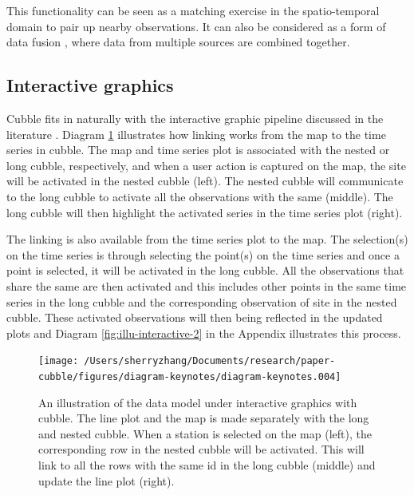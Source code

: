 \documentclass[
]{jss}
\begin{document}
This functionality can be seen as a matching exercise
\citep{stuart2010matching, mcintosh2018using} in the spatio-temporal
domain to pair up nearby observations. It can also be considered as a
form of data fusion \citep{castanedo2013review, cocchi2019data}, where
data from multiple sources are combined together.

\hypertarget{interactive-graphics}{%
\subsection{Interactive graphics}\label{interactive-graphics}}

Cubble fits in naturally with the interactive graphic pipeline discussed
in the literature
\citep{buja1988elements, buja1996interactive, sutherland2000orca, xie2014reactive, cheng2016enabling}.
Diagram \ref{fig:illu-interactive} illustrates how linking works from
the map to the time series in cubble. The map and time series plot is
associated with the nested or long cubble, respectively, and when a user
action is captured on the map, the site will be activated in the nested
cubble (left). The nested cubble will communicate to the long cubble to
activate all the observations with the same  (middle). The long
cubble will then highlight the activated series in the time series plot
(right).

The linking is also available from the time series plot to the map. The
selection(s) on the time series is through selecting the point(s) on the
time series and once a point is selected, it will be activated in the
long cubble. All the observations that share the same  are then
activated and this includes other points in the same time series in the
long cubble and the corresponding observation of site in the nested
cubble. These activated observations will then being reflected in the
updated plots and Diagram \ref{fig:illu-interactive-2} in the Appendix
illustrates this process.

\begin{CodeChunk}
\begin{figure}

{\centering \texttt{[image: /Users/sherryzhang/Documents/research/paper-cubble/figures/diagram-keynotes/diagram-keynotes.004]} 

}

\caption[An illustration of the data model under interactive graphics with cubble]{An illustration of the data model under interactive graphics with cubble. The line plot and the map is made separately with the long and nested cubble. When a station is selected on the map (left), the corresponding row in the nested cubble will be activated. This will link to all the rows with the same id in the long cubble (middle) and update the line plot (right).}\label{fig:illu-interactive}
\end{figure}
\end{CodeChunk}
\end{document}
